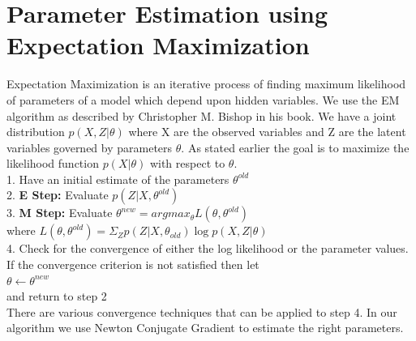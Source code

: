 \documentclass[12pt]{dalcsthesis}
\begin{document}
\section{Parameter Estimation using Expectation Maximization}
Expectation Maximization is an iterative process of finding maximum likelihood of parameters of a model which depend upon hidden variables. We use the EM algorithm as described by Christopher M. Bishop in his book. We have a joint distribution $p(X,Z|\theta)$ where X are the observed variables and Z are the latent variables governed by parameters $\theta$. As stated earlier the goal is to maximize the likelihood function $p(X|\theta)$ with respect to $\theta$.
\\
1. Have an initial estimate of the parameters $\theta ^{old}$
\\
2. \textbf{E Step:} Evaluate $p(Z|X,\theta^{old})$
\\
3. \textbf{M Step:} Evaluate $\theta ^{new} = arg max _{\theta} L(\theta,\theta^{old})$
\\
\hspace*{20 mm} where 
$L(\theta,\theta^{old})=\Sigma _{Z} p(Z|X,\theta_{old}) \log p(X,Z|\theta)$
\\
4. Check for the convergence of either the log likelihood or the parameter values. If the convergence criterion is not satisfied then let
\\
\hspace*{20 mm} $\theta \leftarrow \theta^{new} $
\\
and return to step 2
\\
There are various convergence techniques that can be applied to step 4. In our algorithm we use Newton Conjugate Gradient to estimate the right parameters.	
\end{document}
